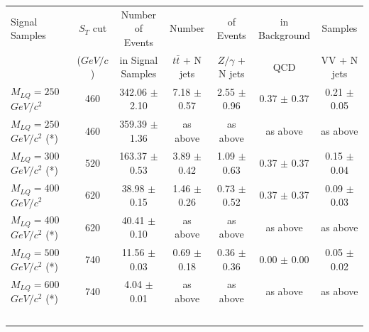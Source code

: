 \documentclass{cmspaper}
\begin{document}
\begin{linenumbers}
\begin{table}[htbp]
\begin{center}
\begin{tabular}{|lcc||cccc|}
\hline\hline
Signal Samples       & $S_T$ cut       & Number of Events     & Number              & of Events           & in Background    & Samples     \\
                     & ($GeV/c$)           & in Signal Samples    & $t\bar{t}$ + N jets & $Z/\gamma$ + N jets & QCD              & VV + N jets \\ 
\hline
$M_{LQ}=250~$$GeV/c^2$     & 460             & 342.06 $\pm$ 2.10    & 7.18  $\pm$ 0.57    & 2.55  $\pm$ 0.96    & 0.37 $\pm$ 0.37  & 0.21 $\pm$ 0.05 \\ 
$M_{LQ}=250~$$GeV/c^2$ (*) & 460             & 359.39 $\pm$ 1.36    & as above            & as above            & as above         & as above        \\
$M_{LQ}=300~$$GeV/c^2$ (*) & 520             & 163.37 $\pm$ 0.53    & 3.89  $\pm$ 0.42    & 1.09  $\pm$ 0.63    & 0.37 $\pm$ 0.37  & 0.15 $\pm$ 0.04 \\ 
$M_{LQ}=400~$$GeV/c^2$     & 620             &  38.98 $\pm$ 0.15    & 1.46  $\pm$ 0.26    & 0.73  $\pm$ 0.52    & 0.37 $\pm$ 0.37  & 0.09 $\pm$ 0.03 \\ 
$M_{LQ}=400~$$GeV/c^2$ (*) & 620             &  40.41 $\pm$ 0.10    & as above            & as above            & as above         & as above        \\
$M_{LQ}=500~$$GeV/c^2$ (*) & 740             &  11.56 $\pm$ 0.03    & 0.69  $\pm$ 0.18    & 0.36  $\pm$ 0.36    & 0.00 $\pm$ 0.00  & 0.05 $\pm$ 0.02 \\ 
$M_{LQ}=600~$$GeV/c^2$ (*) & 740             &   4.04 $\pm$ 0.01    & as above            & as above            & as above         & as above        \\
$$
\end{tabular}
\end{center}
\end{table}
\end{linenumbers}
\end{document}
